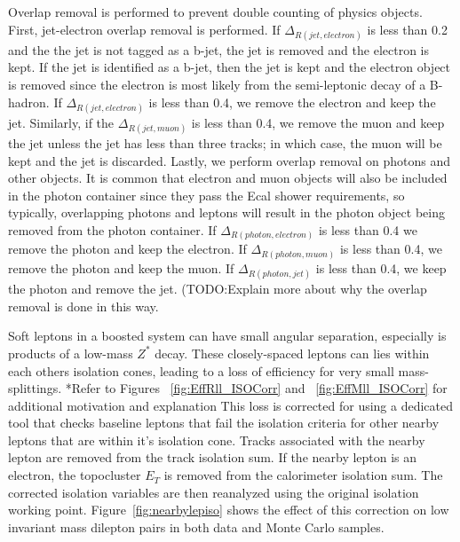 Overlap removal is performed to prevent double counting of physics objects. First, jet-electron overlap removal is performed.  If $\Delta_{R(jet, electron)}$ is less than 0.2 and the the jet is not tagged as a b-jet, the jet is removed and the electron is kept.  If the jet is identified as a b-jet, then the jet is kept and the electron object is removed since the electron is most likely from the semi-leptonic decay of a B-hadron.  If $\Delta_{R(jet, electron)}$ is less than 0.4, we remove the electron and keep the jet.  Similarly, if the $\Delta_{R(jet, muon)}$ is less than 0.4, we remove the muon and keep the jet unless the jet has less than three tracks; in which case, the muon will be kept and the jet is discarded.  Lastly, we perform overlap removal on photons and other objects.  It is common that electron and muon objects will also be included in the photon container since they pass the Ecal shower requirements, so typically, overlapping photons and leptons will result in the photon object being removed from the photon container.  If $\Delta_{R(photon, electron)}$ is less than 0.4 we remove the photon and keep the electron.  If $\Delta_{R(photon, muon)}$ is less than 0.4, we remove the photon and keep the muon.  If $\Delta_{R(photon, jet)}$ is less than 0.4, we keep the photon and remove the jet.  (TODO:Explain more about why the overlap removal is done in this way.

 Soft leptons in a boosted system can have small angular separation, especially is products of a low-mass $Z^*$ decay.  These closely-spaced leptons can lies within each others isolation cones, leading to a loss of efficiency for very small mass-splittings.  *Refer to Figures~ \ref{fig:EffRll_ISOCorr} and ~\ref{fig:EffMll_ISOCorr} for additional motivation and explanation  This loss is corrected for using a dedicated tool that checks baseline leptons that fail the isolation criteria for other nearby leptons that are within it's isolation cone.  Tracks associated with the nearby lepton are removed from the track isolation sum.  If the nearby lepton is an electron, the topocluster $E_T$ is removed from the calorimeter isolation sum.  The corrected isolation variables are then reanalyzed using the original isolation working point.  Figure~\ref{fig:nearbylepiso} shows the effect of this correction on low invariant mass dilepton pairs in both data and Monte Carlo samples.


